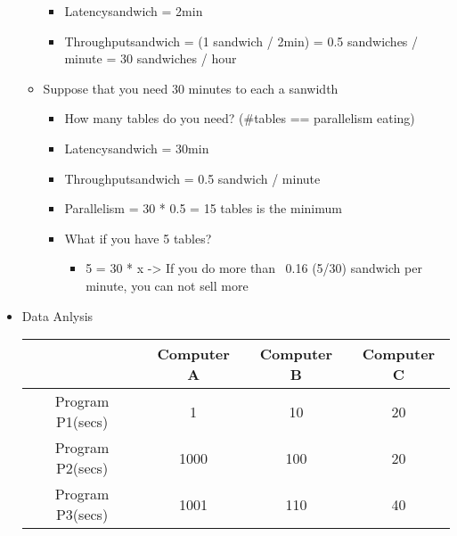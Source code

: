 \documentclass[12pt]{article}
\begin{document}
\begin{itemize}
\begin{itemize}
\begin{itemize}
                                   \item{Latencysandwich = 2min}
                                   \item{Throughputsandwich = (1 sandwich / 2min) = 0.5 sandwiches / minute = 30 sandwiches / hour}
                                \end{itemize}
                            \item{Suppose that you need 30 minutes to each a sanwidth}
                                \begin{itemize}
                                    \item {How many tables do you need? (#tables == parallelism eating)}
                                    \item{Latencysandwich = 30min}
                                    \item{Throughputsandwich = 0.5 sandwich / minute}
                                    \item{Parallelism = 30 * 0.5 = 15 tables is the minimum}
                                    \item{What if you have 5 tables?}
                                    \begin{itemize}
                                        \item{5 = 30 * x -> If you do more than ~0.16 (5/30) sandwich per minute, you can not sell more}
                                    \end{itemize}
                                \end{itemize}
                        \end{itemize}
                    \item {Data Anlysis}
                        \begin{table}[]
                            \begin{tabular}{|c|c|c|c|}
                            \hline
                                             & Computer A & Computer B & Computer C \\ \hline
                            Program P1(secs) & 1          & 10         & 20         \\ \hline
                            Program P2(secs) & 1000       & 100        & 20         \\ \hline
                            Program P3(secs) & 1001       & 110        & 40         \\ \hline
                            \end{tabular}

\end{table}
\end{itemize}
\end{document}
